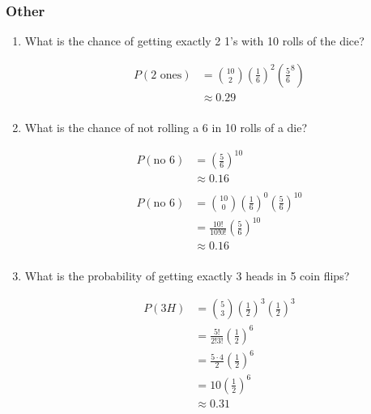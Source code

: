\documentclass[landscape]{exam}
\begin{document}
  \subsubsection{Other}
  \begin{enumerate}
    \item What is the chance of getting exactly 2 1's with 10 rolls of the dice?

      \begin{solution}
        \begin{align*}
        P(\text{2 ones}) & = \binom{10}{2} \left( \frac{1}{6} \right)^2 
            \left( \frac{5}{6}^8 \right) \\
                         & \approx \boxed{ 0.29 } \\
        \end{align*}

      \end{solution}

    \item What is the chance of not rolling a 6 in 10 rolls of a die?

      \begin{solution}
        \begin{align*}
          P( \text{no 6} ) & = \left( \frac{5}{6} \right)^{10} \\
                           & \approx 0.16 \\
          \\
          P( \text{no 6} ) & = \binom{10}{0} \left( \frac{1}{6} \right)^0 
              \left( \frac{5}{6} \right)^{10} \\
                           & = \frac{10!}{10! 0!} \left( \frac{5}{6} \right)^{10} \\
                           & \approx 0.16 \\
        \end{align*}
      \end{solution}

    \item What is the probability of getting exactly 3 heads in 5 coin flips?
      \begin{solution}
        \begin{align*}
          P( 3H ) & = \binom{5}{3} \left( \frac{1}{2} \right)^3 
              \left( \frac{1}{2} \right)^3 \\
                           & = \frac{5!}{2! 3!} \left( \frac{1}{2} \right)^6 \\
                           & = \frac{5 \cdot 4}{2} \left( \frac{1}{2} \right)^6 \\
                           & = 10 \left( \frac{1}{2} \right)^6 \\
                           & \approx \boxed{ 0.31 } \\
        \end{align*}
      \end{solution}


\end{enumerate}
\end{document}
